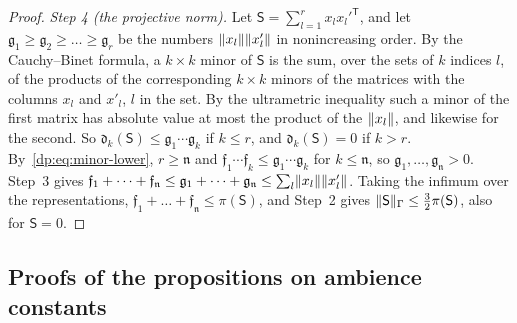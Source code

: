 \begin{proof}
\emph{Step 4 (the projective norm).} Let $\mathsf S=\sum_{l=1}^rx_lx_l'^{\mathsf T}$, and let $\mathfrak g_1\ge\mathfrak g_2\ge\dots\ge\mathfrak g_r$ be the numbers $\lVert x_l\rVert\lVert x'_l\rVert$ in nonincreasing order. By the Cauchy--Binet formula, a $k\times k$ minor of $\mathsf S$ is the sum, over the sets of $k$ indices $l$, of the products of the corresponding $k\times k$ minors of the matrices with the columns $x_l$ and $x'_l$, $l$ in the set. By the ultrametric inequality such a minor of the first matrix has absolute value at most the product of the $\lVert x_l\rVert$, and likewise for the second. So $\mathfrak d_k(\mathsf S)\le\mathfrak g_1\cdots\mathfrak g_k$ if $k\le r$, and $\mathfrak d_k(\mathsf S)=0$ if $k>r$. By~\eqref{dp:eq:minor-lower}, $r\ge\mathfrak n$ and $\mathfrak f_1\cdots\mathfrak f_k\le\mathfrak g_1\cdots\mathfrak g_k$ for $k\le\mathfrak n$, so $\mathfrak g_1,\dots,\mathfrak g_{\mathfrak n}>0$. Step~3 gives $\mathfrak f_1+\dots+\mathfrak f_{\mathfrak n}\le\mathfrak g_1+\dots+\mathfrak g_{\mathfrak n}\le\sum_l\lVert x_l\rVert\lVert x'_l\rVert$. Taking the infimum over the representations, $\mathfrak f_1+\dots+\mathfrak f_{\mathfrak n}\le\pi(\mathsf S)$, and Step~2 gives $\lVert \mathsf S\rVert_\Gamma\le\frac32\pi(\mathsf S)$, also for $\mathsf S=0$.
\end{proof}

\subsection{Proofs of the propositions on ambience constants}\label{dp:ac:proofs}

